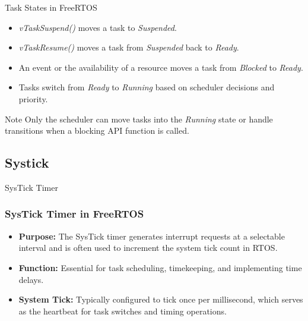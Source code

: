 \documentclass[10pt]{beamer}
\begin{document}
\begin{frame}{Task States in FreeRTOS}
  \begin{itemize}
    \item \textit{vTaskSuspend()} moves a task to \textit{Suspended}.
    \item \textit{vTaskResume()} moves a task from \textit{Suspended} back to \textit{Ready}.
    \item An event or the availability of a resource moves a task from \textit{Blocked} to \textit{Ready}.
    \item Tasks switch from \textit{Ready} to \textit{Running} based on scheduler decisions and priority.
  \end{itemize}
  \begin{block}{Note}
    Only the scheduler can move tasks into the \textit{Running} state or handle transitions when a blocking API function is called.
  \end{block}
\end{frame}

\subsection{Systick}
\begin{frame}{SysTick Timer}
  \frametitle{SysTick Timer in FreeRTOS}
  \begin{itemize}
    \item \textbf{Purpose:} The SysTick timer generates interrupt requests at a selectable interval and is often used to increment the system tick count in RTOS.
    \item \textbf{Function:} Essential for task scheduling, timekeeping, and implementing time delays.
    \item \textbf{System Tick:} Typically configured to tick once per millisecond, which serves as the heartbeat for task switches and timing operations.
  \end{itemize}
  \end{frame}
\end{document}
